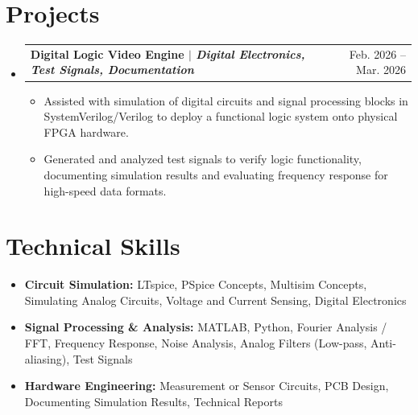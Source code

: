 \documentclass[letterpaper,11pt]{article}
\makeatletter
\newcommand{\resumeItem}[1]{\item{#1}}
\newcommand{\resumeProjectHeading}[2]{
  \item
    \begin{tabular*}{0.97\textwidth}[t]{l@{\extracolsep{\fill}}r}
      \textbf{#1} & #2 \\
    \end{tabular*}
}
\newcommand{\resumeSubHeadingListStart}{\begin{itemize}[label=\textbullet]}
\newcommand{\resumeSubHeadingListEnd}{\end{itemize}}
\newcommand{\resumeItemListStart}{\begin{itemize}[label=-]}
\newcommand{\resumeItemListEnd}{\end{itemize}}
\makeatother
\begin{document}
\section{Projects}
\resumeSubHeadingListStart
  \resumeProjectHeading{Digital Logic Video Engine $\vert$ \emph{Digital Electronics, Test Signals, Documentation}}{Feb. 2026 -- Mar. 2026}
  \resumeItemListStart
    \resumeItem{Assisted with simulation of digital circuits and signal processing blocks in SystemVerilog/Verilog to deploy a functional logic system onto physical FPGA hardware.}
    \resumeItem{Generated and analyzed test signals to verify logic functionality, documenting simulation results and evaluating frequency response for high-speed data formats.}
  \resumeItemListEnd
\resumeSubHeadingListEnd

\section{Technical Skills}
\resumeSubHeadingListStart
  \item{\textbf{Circuit Simulation:} LTspice, PSpice Concepts, Multisim Concepts, Simulating Analog Circuits, Voltage and Current Sensing, Digital Electronics}
  \item{\textbf{Signal Processing \& Analysis:} MATLAB, Python, Fourier Analysis / FFT, Frequency Response, Noise Analysis, Analog Filters (Low-pass, Anti-aliasing), Test Signals}
  \item{\textbf{Hardware Engineering:} Measurement or Sensor Circuits, PCB Design, Documenting Simulation Results, Technical Reports}
\resumeSubHeadingListEnd
\end{document}

